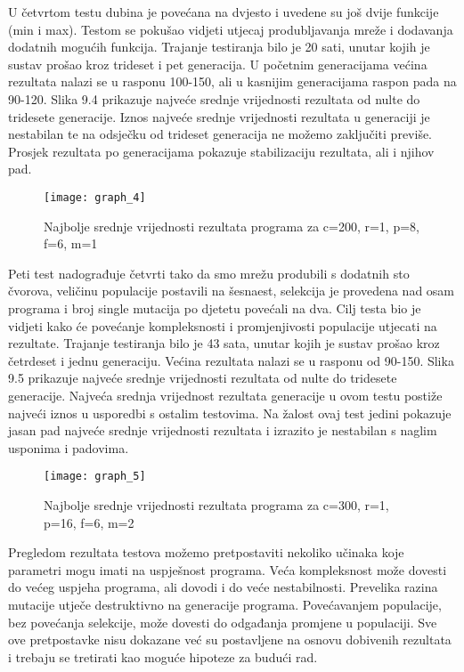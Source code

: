 \par
U četvrtom testu dubina je povećana na dvjesto i uvedene su još dvije funkcije (min i max). Testom se pokušao vidjeti utjecaj produbljavanja mreže i dodavanja dodatnih mogućih funkcija. Trajanje testiranja bilo je 20 sati, unutar kojih je sustav prošao kroz trideset i pet generacija. U početnim generacijama većina rezultata nalazi se u rasponu 100-150, ali u kasnijim generacijama raspon pada na 90-120. Slika 9.4 prikazuje najveće srednje vrijednosti rezultata od nulte do tridesete generacije. Iznos najveće srednje vrijednosti rezultata u generaciji je nestabilan te na odsječku od trideset generacija ne možemo zaključiti previše. Prosjek rezultata po generacijama pokazuje stabilizaciju rezultata, ali i njihov pad. 
 \begin{figure}[h]
	\centering
	\texttt{[image: graph\_4]}
	\caption{Najbolje srednje vrijednosti rezultata programa za c=200, r=1, p=8, f=6, m=1}
\end{figure}

\par
Peti test nadograđuje četvrti tako da smo mrežu produbili s dodatnih sto čvorova, veličinu populacije postavili na šesnaest, selekcija je provedena nad osam programa i broj single mutacija po djetetu povećali na dva. Cilj testa bio je vidjeti kako će povećanje kompleksnosti i promjenjivosti populacije utjecati na rezultate. Trajanje testiranja bilo je 43 sata, unutar kojih je sustav prošao kroz četrdeset i jednu generaciju. Većina rezultata nalazi se u rasponu od 90-150. Slika 9.5 prikazuje najveće srednje vrijednosti rezultata od nulte do tridesete generacije. Najveća srednja vrijednost rezultata generacije u ovom testu postiže najveći iznos u usporedbi s ostalim testovima. Na žalost ovaj test jedini pokazuje jasan pad najveće srednje vrijednosti rezultata i izrazito je nestabilan s naglim usponima i padovima.  
 \begin{figure}[t]
	\centering
	\texttt{[image: graph\_5]}
	\caption{Najbolje srednje vrijednosti rezultata programa za c=300, r=1, p=16, f=6, m=2}
\end{figure}
\par 
Pregledom rezultata testova možemo pretpostaviti nekoliko učinaka koje parametri mogu imati na uspješnost programa. Veća kompleksnost može dovesti do većeg uspjeha programa, ali dovodi i do veće nestabilnosti. Prevelika razina mutacije utječe destruktivno na generacije programa. Povećavanjem populacije, bez povećanja selekcije, može dovesti do odgađanja promjene u populaciji. Sve ove pretpostavke nisu dokazane već su postavljene na osnovu dobivenih rezultata i trebaju se tretirati kao moguće hipoteze za budući rad.
\newpage
\verb| |